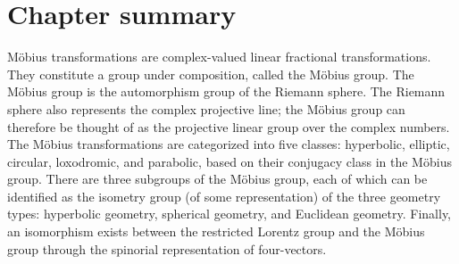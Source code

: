 \section*{Chapter summary}
Möbius transformations are complex-valued linear fractional transformations. They constitute a group under composition, called the Möbius group. The Möbius group is the automorphism group of the Riemann sphere. The Riemann sphere also represents the complex projective line; the Möbius group can therefore be thought of as the projective linear group over the complex numbers. The Möbius transformations are categorized into five classes: hyperbolic, elliptic, circular, loxodromic, and parabolic, based on their conjugacy class in the Möbius group. There are three subgroups of the Möbius group, each of which can be identified as the isometry group (of some representation) of the three geometry types: hyperbolic geometry, spherical geometry, and Euclidean geometry. Finally, an isomorphism exists between the restricted Lorentz group and the Möbius group through the spinorial representation of four-vectors.
